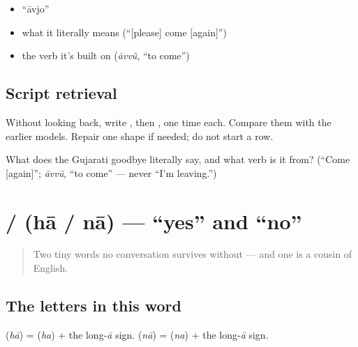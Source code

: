 \begin{itemize}
\raggedright
  \item \textquotedblleft{}āvjo\textquotedblright{}
  \item what it literally means (\textquotedblleft{}{[}please{]} come {[}again{]}\textquotedblright{})
  \item the verb it's built on (\emph{āvvũ}, \textquotedblleft{}to come\textquotedblright{})
\end{itemize}

\subsection*{Script retrieval}
Without looking back, write \textbf{}, then \textbf{}, one time each. Compare them with the earlier models. Repair one shape if needed; do not start a row.

\begin{tcolorbox}[breakable,colback=teal!4,colframe=teal!35!black,title={Before you move on}]
What does the Gujarati goodbye literally say, and what verb is it from? (\textquotedblleft{}Come {[}again{]}\textquotedblright{}; \emph{āvvũ}, \textquotedblleft{}to come\textquotedblright{} — never \textquotedblleft{}I'm leaving.\textquotedblright{})
\end{tcolorbox}
\section[\texorpdfstring{\gu{હા} / \gu{ના} (hā / nā)}{હા / ના (hā / nā)}]{ /  (hā / nā) — \textquotedblleft{}yes\textquotedblright{} and \textquotedblleft{}no\textquotedblright{}}

\label{lesson:GU-C01-haa-naa}



\begin{quote}
Two tiny words no conversation survives without — and one is a cousin of English.
\end{quote}

\subsection*{The letters in this word}
\textbf{} (\emph{hā}) = \textbf{} (\emph{ha}) + the long-\emph{ā} sign. \textbf{} (\emph{nā}) = \textbf{} (\emph{na}) + the long-\emph{ā} sign.

